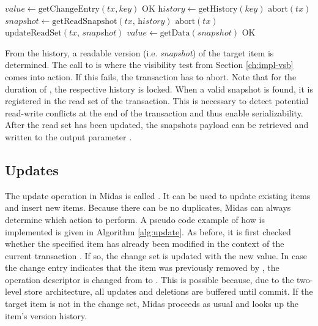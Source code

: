 \begin{algorithm}[!ht]
\begin{algorithmic}[1]
\State $\textit{value} \gets \text{getChangeEntry}(tx, key)$
\State \Return $\text{OK}$
\EndIf
\State $\textit{history} \gets \text{getHistory}(\textit{key})$
\State \Return $\text{abort}(tx)$
\EndIf
\State $\textit{snapshot} \gets \text{getReadSnapshot}(\textit{tx, history})$
\State \Return $\text{abort}(tx)$
\EndIf
\State $\text{updateReadSet}(\textit{tx, snapshot})$
\State $\textit{value} \gets \text{getData}(snapshot)$
\State \Return $\text{OK}$
\EndProcedure
\end{algorithmic}
\caption{}
\label{alg:read}
\end{algorithm}

From the history, a readable version (i.e. \emph{snapshot}) of the target item is determined. The call to  is where the visibility test from Section \ref{ch:impl-vsb} comes into action. If this fails, the transaction has to abort. Note that for the duration of , the respective history is locked. When a valid snapshot is found, it is registered in the read set of the transaction. This is necessary to detect potential read-write conflicts at the end of the transaction and thus enable serializability. After the read set has been updated, the snapshots payload can be retrieved and written to the output parameter .

\subsection{Updates}

The update operation in Midas is called . It can be used to update existing items and insert new items. Because there can be no duplicates, Midas can always determine which action to perform. A pseudo code example of how  is implemented is given in Algorithm \ref{alg:update}. As before, it is first checked whether the specified item has already been modified in the context of the current transaction . If so, the change set is updated with the new value. In case the change entry indicates that the item was previously removed by , the operation descriptor is changed from  to . This is possible because, due to the two-level store architecture, all updates and deletions are buffered until commit. If the target item is not in the change set, Midas proceeds as usual and looks up the item's version history.

